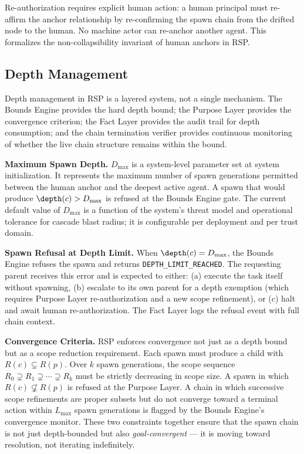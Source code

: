 Re-authorization requires explicit human action: a human principal must re-affirm the anchor relationship by re-confirming the spawn chain from the drifted node to the human. No machine actor can re-anchor another agent. This formalizes the non-collapsibility invariant of human anchors in RSP.

\subsection{Depth Management}
\label{sec:rs-protocol-depth-management}

Depth management in RSP is a layered system, not a single mechanism. The Bounds Engine provides the hard depth bound; the Purpose Layer provides the convergence criterion; the Fact Layer provides the audit trail for depth consumption; and the chain termination verifier provides continuous monitoring of whether the live chain structure remains within the bound.

\bigskip
\noindent\textbf{Maximum Spawn Depth.} $D_{\max}$ is a system-level parameter set at system initialization. It represents the maximum number of spawn generations permitted between the human anchor and the deepest active agent. A spawn that would produce $\depth(c) > D_{\max}$ is refused at the Bounds Engine gate. The current default value of $D_{\max}$ is a function of the system's threat model and operational tolerance for cascade blast radius; it is configurable per deployment and per trust domain.

\bigskip
\noindent\textbf{Spawn Refusal at Depth Limit.} When $\depth(c) = D_{\max}$, the Bounds Engine refuses the spawn and returns \texttt{DEPTH\_LIMIT\_REACHED}. The requesting parent receives this error and is expected to either: (a) execute the task itself without spawning, (b) escalate to its own parent for a depth exemption (which requires Purpose Layer re-authorization and a new scope refinement), or (c) halt and await human re-authorization. The Fact Layer logs the refusal event with full chain context.

\bigskip
\noindent\textbf{Convergence Criteria.} RSP enforces convergence not just as a depth bound but as a scope reduction requirement. Each spawn must produce a child with $R(c) \subsetneq R(p)$. Over $k$ spawn generations, the scope sequence $R_0 \supsetneq R_1 \supsetneq \cdots \supsetneq R_k$ must be strictly decreasing in scope size. A spawn in which $R(c) \not\subsetneq R(p)$ is refused at the Purpose Layer. A chain in which successive scope refinements are proper subsets but do not converge toward a terminal action within $L_{\max}$ spawn generations is flagged by the Bounds Engine's convergence monitor. These two constraints together ensure that the spawn chain is not just depth-bounded but also \emph{goal-convergent} — it is moving toward resolution, not iterating indefinitely.


